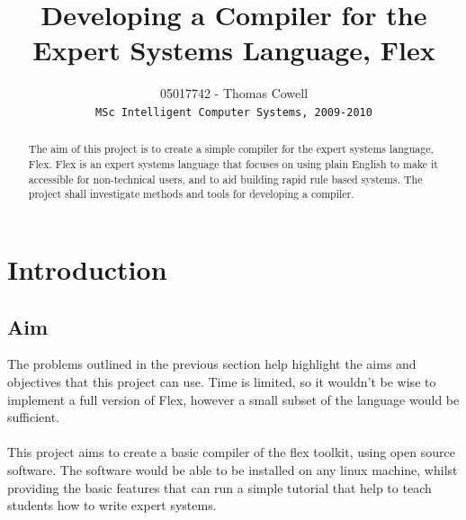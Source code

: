 \documentclass[12pt]{report}
\begin{document}
\title{Developing a Compiler for the Expert Systems Language, Flex}
\author{05017742 - Thomas Cowell\\
		\texttt{MSc Intelligent Computer Systems, 2009-2010}}

\maketitle



\begin{abstract}
The aim of this project is to create a simple compiler for the expert systems language, Flex.  Flex is an expert systems language that focuses on using plain English to make it accessible for non-technical users, and to aid building rapid rule based systems.  The project shall investigate methods and tools for developing a compiler.
\end{abstract}

\pagestyle{plain}

\tableofcontents

\cleardoublepage
{}

\chapter{Introduction}
\section{Aim}\label{sec:aim}
The problems outlined in the previous section help highlight the aims and objectives that this project can use.  Time is limited, so it wouldn't be wise to implement a full version of Flex, however a small subset of the language would be sufficient.
\\
\\
This project aims to create a basic compiler of the flex toolkit, using open source software.  The software would be able to be installed on any linux machine, whilst providing the basic features that can run a simple tutorial that help to teach students how to write expert systems.
\clearpage
\end{document}
